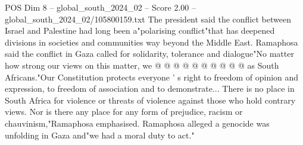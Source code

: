 \begin{textsample}{POS Dim 8 – global\_south\_2024\_02 – Score 2.00 – global\_south\_2024\_02/105800159.txt}
The president said the conflict between Israel and Palestine had long been a"polarising conflict"that has deepened divisions in societies and communities way beyond the Middle East.
Ramaphosa said the conflict in Gaza called for solidarity, tolerance and dialogue"No matter how strong our views on this matter, we @ @ @ @ @ @ @ @ @ @ as South Africans."Our Constitution protects everyone ' s right to freedom of opinion and expression, to freedom of association and to demonstrate...
There is no place in South Africa for violence or threats of violence against those who hold contrary views.
Nor is there any place for any form of prejudice, racism or chauvinism,"Ramaphosa emphasised.
Ramaphosa alleged a genocide was unfolding in Gaza and"we had a moral duty to act."

\end{textsample}
